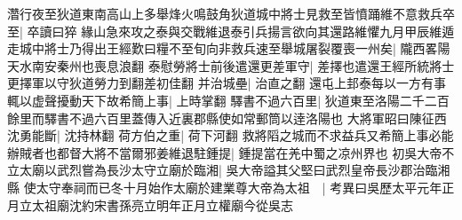 濳行夜至狄道東南高山上多舉烽火鳴鼓角狄道城中將士見救至皆憤踊維不意救兵卒至|{
	卒讀曰猝}
緣山急來攻之泰與交戰維退泰引兵揚言欲向其還路維懼九月甲辰維遁走城中將士乃得出王經歎曰糧不至旬向非救兵速至舉城屠裂覆喪一州矣|{
	隴西畧陽天水南安秦州也喪息浪翻}
泰慰勞將士前後遣還更差軍守|{
	差擇也遣還王經所統將士更擇軍以守狄道勞力到翻差初佳翻}
并治城壘|{
	治直之翻}
還屯上邽泰每以一方有事輒以虚聲擾動天下故希簡上事|{
	上時掌翻}
驛書不過六百里|{
	狄道東至洛陽二千二百餘里而驛書不過六百里蓋傳入近裏郡縣使如常郵筒以逹洛陽也}
大將軍昭曰陳征西沈勇能斷|{
	沈持林翻}
荷方伯之重|{
	荷下河翻}
救將䧟之城而不求益兵又希簡上事必能辦賊者也都督大將不當爾邪姜維退駐鍾提|{
	鍾提當在羌中蜀之凉州界也}
初吳大帝不立太廟以武烈嘗為長沙太守立廟於臨湘|{
	吳大帝謚其父堅曰武烈皇帝長沙郡治臨湘縣}
使太守奉祠而已冬十月始作太廟於建業尊大帝為太祖　|{
	考異曰吳歷太平元年正月立太祖廟沈約宋書孫亮立明年正月立權廟今從吳志}


